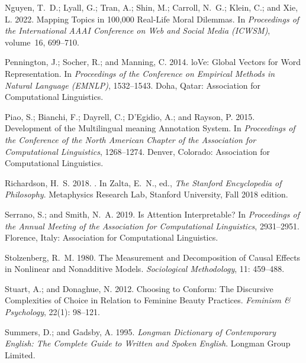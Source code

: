 \documentclass[letterpaper]{article} %
\begin{document}
\begin{thebibliography}{46}
Nguyen, T.~D.; Lyall, G.; Tran, A.; Shin, M.; Carroll, N.~G.; Klein, C.; and
  Xie, L. 2022.
\newblock Mapping Topics in 100,000 Real-Life Moral Dilemmas.
\newblock In \emph{Proceedings of the International AAAI Conference on Web and
  Social Media (ICWSM)}, volume~16, 699--710.

Pennington, J.; Socher, R.; and Manning, C. 2014.
lo{V}e: Global Vectors for Word Representation.
\newblock In \emph{Proceedings of the Conference on Empirical Methods in Natural Language (EMNLP)}, 1532--1543. Doha, Qatar: Association
  for Computational Linguistics.

Piao, S.; Bianchi, F.; Dayrell, C.; D{'}Egidio, A.; and Rayson, P. 2015.
\newblock Development of the Multilingual meaning Annotation System.
\newblock In \emph{Proceedings of the Conference of the North American Chapter of the Association for Computational Linguistics},
  1268--1274. Denver, Colorado: Association for Computational Linguistics.

Richardson, H.~S. 2018.
.
\newblock In Zalta, E.~N., ed., \emph{The {Stanford} Encyclopedia of
  Philosophy}. Metaphysics Research Lab, Stanford University, {F}all 2018
  edition.

Serrano, S.; and Smith, N.~A. 2019.
\newblock Is Attention Interpretable?
\newblock In \emph{Proceedings of the Annual Meeting of the Association for
  Computational Linguistics}, 2931--2951. Florence, Italy: Association for
  Computational Linguistics.

Stolzenberg, R.~M. 1980.
\newblock The Measurement and Decomposition of Causal Effects in Nonlinear and
  Nonadditive Models.
\newblock \emph{Sociological Methodology}, 11: 459--488.

Stuart, A.; and Donaghue, N. 2012.
\newblock Choosing to Conform: {T}he Discursive Complexities of Choice in
  Relation to Feminine Beauty Practices.
\newblock \emph{Feminism \& Psychology}, 22(1): 98--121.

Summers, D.; and Gadsby, A. 1995.
\newblock \emph{Longman Dictionary of Contemporary English: The Complete Guide
  to Written and Spoken English}.
\newblock Longman Group Limited. 


\end{thebibliography}
\end{document}
